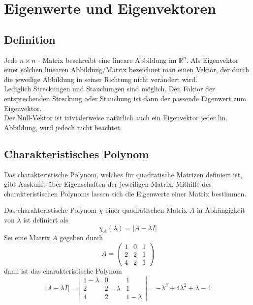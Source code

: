
\section{Eigenwerte und Eigenvektoren}
\label{sec:eigenwerte_und_eigenvektoren}

\subsection{Definition}
\label{sub:definition-eigenwerte}
Jede $n \times n$ - Matrix beschreibt eine lineare Abbildung im $\mathbb{R}^n$.
Als Eigenvektor einer solchen linearen Abbildung/Matrix bezeichnet man einen Vektor, der durch die jeweilige 
Abbildung in seiner Richtung nicht verändert wird.\\
Lediglich Streckungen und Stauchungen sind möglich. Den Faktor der entsprechenden 
Streckung oder Stauchung ist dann der passende Eigenwert zum Eigenvektor.\\
Der Null-Vektor ist trivialerweise natürlich auch ein Eigenvektor jeder lin. Abbildung, wird jedoch nicht beachtet.

\subsection{Charakteristisches Polynom}
\label{sub:charakteristisches_polynom}

Das charakteristische Polynom, welches für quadratische Matrizen definiert ist, gibt Auskunft über Eigenschaften
der jeweiligen Matrix. Mithilfe des charakteristischen Polynoms lassen sich die Eigenwerte einer Matrix bestimmen.

Das charakteristische Polynom $\chi$ einer quadratischen Matrix $A$ in Abhängigkeit von $\lambda$ 
ist definiert als 
\begin{equation}
	\chi_A(\lambda) = |A - \lambda I|
\end{equation}
Sei eine Matrix $A$ gegeben durch
\begin{displaymath}
	A = \left( \begin{matrix}1 & 0 & 1 \\ 2 & 2 & 1 \\ 4 & 2 & 1 \end{matrix} \right)
\end{displaymath}
dann ist das charakteristische Polynom
\begin{displaymath}
	|A - \lambda I| 
	= \left| \begin{matrix} 1 - \lambda & 0 & 1 \\ 2 & 2 - \lambda & 1 \\ 4 & 2 & 1 -\lambda \end{matrix} \right|
	= - \lambda^3 + 4 \lambda^2 + \lambda - 4
\end{displaymath}

